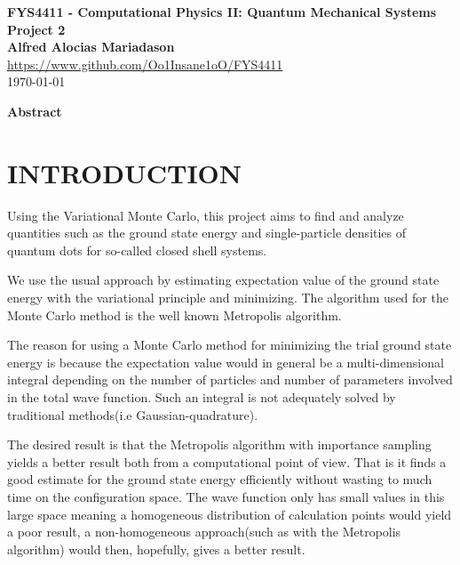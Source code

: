 \documentclass[a4paper, hidelinks, 10pt]{article}
\newcommand{\mdate}{\today}
\newcommand{\mtitle}{FYS4411}
\newcommand{\mauthor}{Alfred Alocias Mariadason}
\newcommand{\massignn}{Project 2}
\let\oldsection\section
\renewcommand{\section}[1]{\centering \oldsection{{#1}} \justifying}
\begin{document}
\thispagestyle{empty}
\begin{center} \vspace{1cm}
    \textbf{\Large{\mtitle\hspace{0.01pt} - Computational Physics II: Quantum
    Mechanical Systems}}\\ \vspace{0.5cm}
    \textbf{\large{\massignn}}\\ \vspace{1cm}
    \textbf{\large{\mauthor}}\\ \vspace{0.5cm}
    \large{\url{https://www.github.com/Oo1Insane1oO/FYS4411}} \\ \vspace{0.5cm}
    \Large{\mdate}\\ \vfill
\end{center}

\clearpage
\setcounter{page}{1}

\begin{center}
    \textbf{Abstract} \\
\end{center}

\section{INTRODUCTION}
\label{sec:introduction}
    Using the Variational Monte Carlo, this project aims to find and analyze
    quantities such as the ground state energy and single-particle densities of
    quantum dots for so-called closed shell systems.

    We use the usual approach by estimating expectation value of the ground
    state energy with the variational principle and minimizing. The algorithm
    used for the Monte Carlo method is the well known Metropolis algorithm.

    The reason for using a Monte Carlo method for minimizing the trial ground
    state energy is because the expectation value would in general be a
    multi-dimensional integral depending on the number of particles and number
    of parameters involved in the total wave function. Such an integral is not
    adequately solved by traditional methods(i.e Gaussian-quadrature).

    The desired result is that the Metropolis algorithm with importance
    sampling yields a better result both from a computational point of view.
    That is it finds a good estimate for the ground state energy efficiently
    without wasting to much time on the configuration space. The wave function
    only has small values in this large space meaning a homogeneous
    distribution of calculation points would yield a poor result, a
    non-homogeneous approach(such as with the Metropolis algorithm) would then,
    hopefully, gives a better result.
\end{document}

